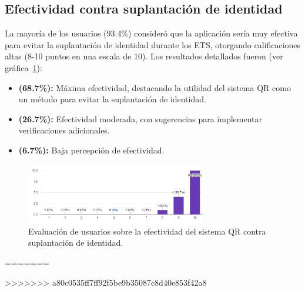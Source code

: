 \subsection{Efectividad contra suplantación de identidad}

La mayoría de los usuarios (93.4\%) consideró que la aplicación sería muy efectiva para evitar la suplantación de identidad durante los ETS, otorgando calificaciones altas (8-10 puntos en una escala de 10). Los resultados detallados fueron (ver gráfica~\ref{fig:efectividad}):

\begin{itemize}
	\item \textbf{(68.7\%):} Máxima efectividad, destacando la utilidad del sistema QR como un método para evitar la suplantación de identidad.
	\item \textbf{(26.7\%):} Efectividad moderada, con sugerencias para implementar verificaciones adicionales.
	\item \textbf{(6.7\%):} Baja percepción de efectividad.
\end{itemize}

\begin{figure}[H]
	\centering
	\includegraphics[width=0.7\textwidth]{images/efectividad.png}
	\caption{Evaluación de usuarios sobre la efectividad del sistema QR contra suplantación de identidad.}
	\label{fig:efectividad}
\end{figure}
=======




>>>>>>> a80c0535ff7ff92f5be9b35087c8d40e853f42a8
